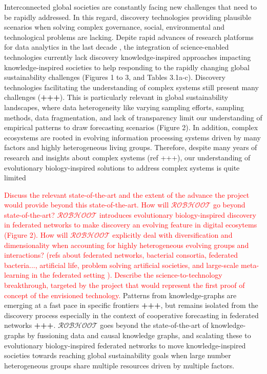 \documentclass[11pt, a4paper]{article} %
\begin{document}
Interconnected global societies are constantly facing new challenges
that need to be rapidly addressed. In this regard, discovery
technologies providing plausible scenarios when solving complex
governance, social, environmental and technological problems are
lacking. Depite rapid advances of research platforms for data
analytics in the last decade
\citep{Melniketal:2010,Steinruecken,Modulos,Guimera2020,GoogleAI,IrisAI,easeml,datarobot,aito},
the integration of science-enabled technologies currently lack
discovery knowledge-inspired approaches impacting knowledge-inspired
societies to help responding to the rapidly changing global
sustainability challenges (Figures 1 to 3, and Tables
3.1a-c). Discovery technologies facilitating the understanding of
complex systems still present many challenges ({\bf +++}). This is
particularly relevant in global sustainability landscapes, where data
heterogeneity like varying sampling efforts, sampling methods, data
fragmentation, and lack of transparency limit our understanding of
empirical patterns to draw forecasting scenarios (Figure 2). In
addition, complex ecosystems are rooted in evolving information
processing systems driven by many factors and highly heterogeneous
living groups. Therefore, despite many years of research and insights
about complex systems (ref +++), our understanding of evolutionary
biology-inspired solutions to address complex systems is quite limited

\textcolor{red}{Discuss the relevant state-of-the-art and the extent
  of the advance the project would provide beyond this
  state-of-the-art. How will $\mathcal{ROBHOOT}$ go beyond
  state-of-the-art? $\mathcal{ROBHOOT}$ introduces evolutionary
  biology-inspired discovery in federated networks to make discovery
  an evolving feature in digital ecosytems (Figure 2). How will
  $\mathcal{ROBHOOT}$ explicitly deal with diversification and
  dimensionality when accounting for highly heterogeneous evolving
  groups and interactions? (refs about federated networks, bacterial
  consortia, federated bacteria..., artificial life, problem solving
  artificial societies, and large-scale meta-learning in the federated
  setting \citep{Dilley2016}). Describe the science-to-technology
  breakthrough, targeted by the project that would represent the first
  proof of concept of the envisioned technology.} Patterns from
knowledge-graphs are emerging at a fast pace in specific frontiers
{\bf +++}, but remains isolated from the discovery process especially
in the context of cooperative forecasting in federated networks {\bf
  +++}. $\mathcal{ROBHOOT}$ goes beyond the state-of-the-art of
knowledge-graphs by fussioning data and causal knowledge graphs, and
scalating these to evolutionary biology-inspired federated networks to
move knowledge-inspired societies towards reaching global
sustainability goals when large number heterogeneous groups share
multiple resources driven by multiple factors.
\end{document}
